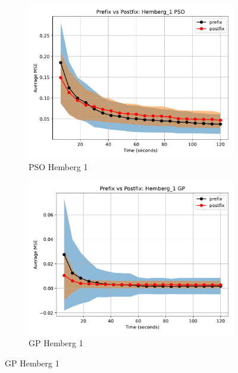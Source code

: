 \documentclass[12pt]{iopart}
\begin{document}
\begin{figure}
    \vspace{0.5cm}
    
    \begin{subfigure}[b]{0.4\textwidth}
        \includegraphics[width=\linewidth, keepaspectratio]{Hemberg_Benchmarks/PrePostHemberg_1PSO.pdf}
        \caption{PSO Hemberg 1}
        \label{subfig:hemberg_1_PSO}
    \end{subfigure}
    \begin{subfigure}[b]{0.4\textwidth}
        \includegraphics[width=\linewidth, keepaspectratio]{Hemberg_Benchmarks/PrePostHemberg_1GP.pdf}
        \caption{GP Hemberg 1}
        \label{subfig:hemberg_1_GP}
    \end{subfigure}
    

\end{figure}
\end{document}
